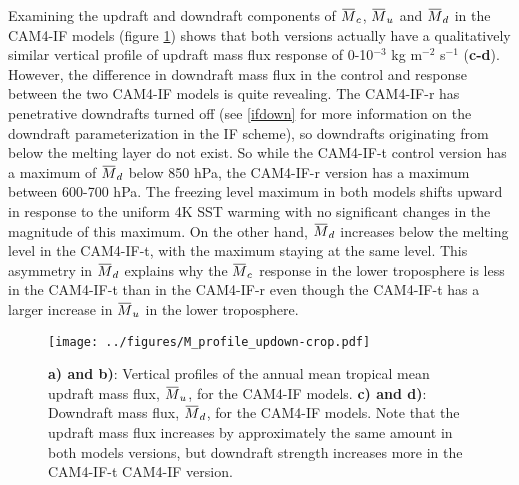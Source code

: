 \documentclass[letterpaper,12pt,titlepage,oneside,final]{book}
\newcommand{\overbar}[1]{\mkern 1.5mu\overline{\mkern-1.5mu#1\mkern-1.5mu}\mkern 1.5mu}
\begin{document}
Examining the updraft and downdraft components of $\overbar{M}_{c}$, $\overbar{M}_{u}$ and $\overbar{M}_{d}$  in the CAM4-IF models (figure \ref{fig:updown}) shows that both versions actually have a qualitatively similar vertical profile of updraft mass flux response of 0-10$^{-3}$ kg m$^{-2}$ s$^{-1}$ (\textbf{c-d}). However, the difference in downdraft mass flux in the control and response between the two CAM4-IF models is quite revealing. The CAM4-IF-r has penetrative downdrafts turned off (see \ref{ifdown} for more information on the downdraft parameterization in the IF scheme), so downdrafts originating from below the melting layer do not exist. So while the CAM4-IF-t control version has a maximum of $\overbar{M}_{d}$ below 850 hPa, the CAM4-IF-r version has a maximum between 600-700 hPa. The freezing level maximum in both models shifts upward in response to the uniform 4K SST warming with no significant changes in the magnitude of this maximum. On the other hand, $\overbar{M}_{d}$  increases below the melting level in the CAM4-IF-t, with the maximum staying at the same level. This asymmetry in $\overbar{M}_{d}$ explains why the $\overbar{M}_{c}$ response in the lower troposphere is less in the CAM4-IF-t than in the CAM4-IF-r even though the CAM4-IF-t has a larger increase in $\overbar{M}_{u}$ in the lower troposphere. 
\begin{figure}[H]
\centering
\noindent\texttt{[image: ../figures/M\_profile\_updown-crop.pdf]}\hfill
\caption{ \textbf{a) and b)}: Vertical profiles of the annual mean tropical mean updraft mass flux, $\overbar{M}_{u}$, for the CAM4-IF models. \textbf{c) and d)}: Downdraft mass flux, $\overbar{M}_{d}$, for the CAM4-IF models. Note that the updraft mass flux increases by approximately the same amount in both models versions, but downdraft strength increases more in the CAM4-IF-t CAM4-IF version.}
\label{fig:updown}
\end{figure}
\end{document}
